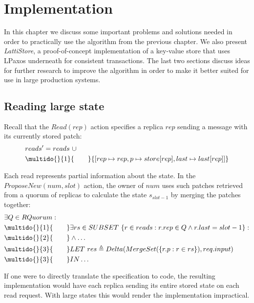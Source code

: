 \documentclass[12pt,a4paper,en]{pracamgr}
\newcommand{\ti}[1]{\textit{#1}}
\newcommand{\ind}[1]{\multido{}{#1}{\qquad}}
\begin{document}
\chapter{Implementation}\label{chapt-impl}

In this chapter we discuss some important problems and solutions needed in order to practically use the algorithm from the previous chapter. We also present \ti{LattiStore}, a proof-of-concept implementation of a key-value store that uses LPaxos underneath for consistent transactions. The last two sections discuss ideas for further research to improve the algorithm in order to make it better suited for use in large production systems.

\section{Reading large state}\label{large-state}

Recall that the $Read(rep)$ action specifies a replica $rep$ sending a message with its currently stored patch:
\begin{align*}
    & reads' = reads\ \cup\\
    & \ind{1} \{[rep \mapsto rep, p \mapsto store[rep], last \mapsto last[rep]]\}
\end{align*}

Each read represents partial information about the state. In the $ProposeNew(num, slot)$ action, the owner of $num$ uses such patches retrieved from a quorum of replicas to calculate the state $s_{slot - 1}$ by merging the patches together:
\begin{align*}
    & \exists Q \in RQuorum:\\
    & \ind{1} \exists rs \in SUBSET\ \{r \in reads: r.rep \in Q \land r.last = slot - 1\}:\\
    & \ind{2} \land \dots\\
    & \ind{3} LET\ res \triangleq Delta(MergeSet(\{r.p: r \in rs\}), req.input)\\
    & \ind{3} IN \dots
\end{align*}

If one were to directly translate the specification to code, the resulting implementation would have each replica sending its entire stored state on each read request. With large states this would render the implementation impractical.
\end{document}
